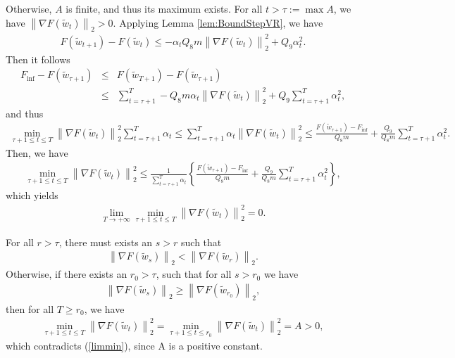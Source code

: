 \documentclass[twoside]{article}
\begin{document}
Otherwise, $A$ is finite, and thus its maximum exists. For all $t>\tau:=\max A$, we have $\left\| \nabla F(\tilde w_{t})\right\|_2>0$.
Applying Lemma \ref{lem:BoundStepVR}, we have
\begin{eqnarray}
F(\widetilde w_{t+1}) - F(\widetilde w_{t}) \leq - \alpha_t Q_8 m\left\|\nabla F(\tilde w_t)\right\|_2^2 + Q_9 \alpha_t^2.\nonumber
\end{eqnarray}
Then it follows
\begin{eqnarray}
F_{\inf} - F(\widetilde w_{\tau+1})&\leq& F(\widetilde w_{T+1}) - F(\widetilde w_{\tau+1}) \nonumber\\
&\leq& \sum_{t=\tau+1}^{T} -Q_8 m \alpha_t \left\|\nabla F(\widetilde w_t)\right\|_2^2 + Q_9\sum_{t=\tau+1}^T \alpha_t^2,\nonumber
\end{eqnarray}
and thus
\begin{eqnarray}
\min_{\tau+1 \leq t \leq T} \left\|\nabla F(\widetilde w_t)\right\|_2^2 \sum_{t=\tau+1}^T\alpha_t \leq \sum_{t=\tau+1}^T \alpha_t \left\|\nabla F(\widetilde w_t)\right\|_2^2 \leq \frac{F(\widetilde w_{\tau+1}) - F_{\inf}}{Q_8m} + \frac{Q_9}{Q_8m}\sum_{t=\tau+1}^T\alpha_t^2.\nonumber
\end{eqnarray}
Then, we have
\begin{eqnarray}
\min_{\tau+1\leq t \leq T} \left\|\nabla F(\widetilde w_t)\right\|_2^2 \leq \frac{1}{\sum_{t=\tau+1}^T \alpha_t} \left\{\frac{F(\widetilde w_{\tau+1}) - F_{\inf}}{Q_8m} + \frac{Q_9}{Q_8m}\sum_{t=\tau+1}^T\alpha_t^2\right\},\nonumber
\end{eqnarray}
which yields 
\begin{eqnarray}
\label{limmin}
\lim_{T\to+\infty}\min_{\tau+1\leq t\leq T} \left\|\nabla F(\widetilde w_{t})\right\|_2^2 = 0.
\end{eqnarray}

 For all $r>\tau$, there must exists an $s>r$ such that
\begin{eqnarray}
\left\|\nabla F(\widetilde w_s) \right\|_2 < \left\|\nabla F(\widetilde w_{r})\right\|_2.\nonumber
\end{eqnarray}
Otherwise, if there exists an $r_0>\tau$, such that for all $s>r_0$ we have
\begin{eqnarray}
\left\|\nabla F(\widetilde w_s)\right\|_2\geq \left\|\nabla F(\widetilde w_{r_0})\right\|_2,\nonumber
\end{eqnarray}
then for all $T\geq r_0$, we have 
\begin{eqnarray}
\min_{\tau+1\leq t\leq T}\left\|\nabla F(\widetilde w_{t}) \right\|_2^2 = \min_{\tau+1\leq t\leq r_0} \left\|\nabla F(\widetilde w_{t})\right\|_2^2=A>0,\nonumber
\end{eqnarray}
which contradicts (\ref{limmin}), since A is a positive constant.
\end{document}

